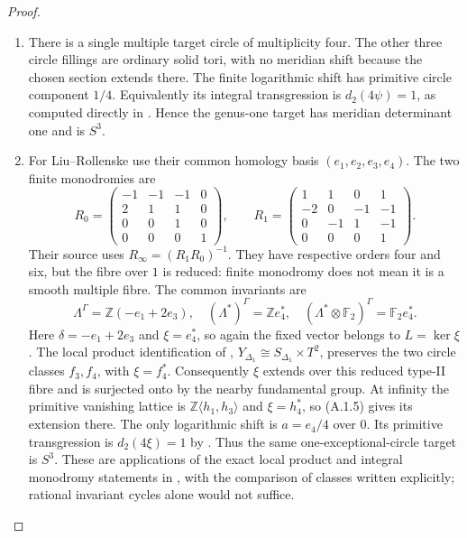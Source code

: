 \begin{proof}
\begin{enumerate}[label=\arabic*.,leftmargin=*]
\item There is a single multiple target circle of
multiplicity four.  The other three circle
fillings are ordinary solid tori, with no
meridian shift because the chosen section
extends there.  The finite logarithmic
shift has primitive circle component $1/4$.
Equivalently its integral transgression is
$d_2(4\psi)=1$, as computed directly in
\cite[Proposition 5.4]{mapsVia2}.
Hence the genus-one target has meridian
determinant one and is $S^3$.

\item For Liu--Rollenske use their common homology
basis $(e_1,e_2,e_3,e_4)$.  The two finite
monodromies are
\[
 R_0=\begin{pmatrix}-1&-1&-1&0\\2&1&1&0\\0&0&1&0\\0&0&0&1\end{pmatrix},
 \qquad
 R_1=\begin{pmatrix}1&1&0&1\\-2&0&-1&-1\\0&-1&1&-1\\0&0&0&1\end{pmatrix}.
\]
Their source uses $R_\infty=(R_1R_0)^{-1}$.
They have respective orders four and six,
but the fibre over $1$ is reduced: finite
monodromy does not mean it is a smooth
multiple fibre.  The common invariants are
\[
 \Lambda^\Gamma=\mathbb Z(-e_1+2e_3),
 \quad(\Lambda^*)^\Gamma=\mathbb Z e_4^*,
 \quad(\Lambda^*\otimes\mathbb F_2)^\Gamma
            =\mathbb F_2 e_4^*.
 \tag{B.4.3}\label{maps:eq:B.4.3}
\]
Here $\delta=-e_1+2e_3$ and $\xi=e_4^*$,
so again the fixed vector belongs to
$L=\ker\xi$.
The local product identification of
\cite[Lemma 3.10 and Proposition 3.11]{mapsLR},
$Y_{\Delta_1}\cong S_{\Delta_1}\times T^2$,
preserves the two circle classes $f_3,f_4$,
with $\xi=f_4^*$.  Consequently $\xi$
extends over this reduced type-II fibre
and is surjected onto by the nearby
fundamental group.  At infinity the
primitive vanishing lattice is
$\mathbb Z\langle h_1,h_3\rangle$ and
$\xi=h_4^*$, so (A.1.5) gives its
extension there.  The only logarithmic
shift is $a=e_4/4$ over $0$.
Its primitive transgression is
$d_2(4\xi)=1$ by \cite[Proposition 4.8]{mapsLR}.
Thus the same one-exceptional-circle
target is $S^3$.  These are applications
of the exact local product and integral
monodromy statements in
\cite[Propositions 3.12--3.13 and Corollary 3.16]{mapsLR},
with the comparison of classes written
explicitly; rational invariant cycles
alone would not suffice.


\end{enumerate}
\end{proof}
